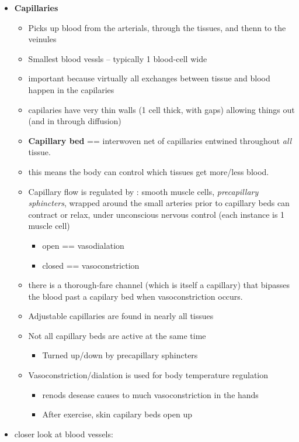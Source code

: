 \documentclass{article}
\theoremstyle{definition}
\begin{document}
\begin{itemize}
	\item \textbf{Capillaries} 
		\begin{itemize}
			\item Picks up blood from the arterials, through the tissues, and thenn to the veinules
			\item Smallest blood vessls -- typically 1 blood-cell wide
			\item important because virtually all exchanges between tissue and blood happen in the capilaries
			\item capilaries have very thin walls (1 cell thick, with gaps) allowing things out (and in through diffusion)
			\item \textbf{Capillary bed}  == interwoven net of capillaries entwined throughout \textit{all}  tissue.
			\item this means the body can control which tissues get more/less blood.
			\item Capillary flow is regulated by : smooth muscle cells, \textit{precapillary sphincters}, wrapped around the small arteries prior to capillary beds can contract or relax, under unconscious nervous control
				(each instance is 1 muscle cell)
				\begin{itemize}
					\item open == vasodialation
					\item closed == vasoconstriction
				\end{itemize}
			\item there is a thorough-fare channel (which is itself a capillary) that bipasses the blood past a capilary bed when vasoconstriction occurs.
			\item Adjustable capillaries are found in nearly all tissues
			\item Not all capillary beds are active at the same time 
				\begin{itemize}
					\item Turned up/down by precapillary sphincters
				\end{itemize}
			\item Vasoconstriction/dialation is used for body temperature regulation
				\begin{itemize}
					\item renods desease causes to much vasoconstriction in the hands
					\item After exercise, skin capilary beds open up
				\end{itemize}
		\end{itemize}
	\item closer look at blood vessels:

\end{itemize}
\end{document}
